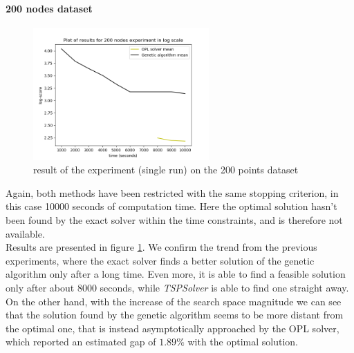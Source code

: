 \documentclass{article}
\begin{document}
\paragraph*{200 nodes dataset}

\begin{figure}
    \centering
\includegraphics[width=0.6\textwidth]{pics/200_nodes_results.png}
\caption{result of the experiment (single run) on the 200 points dataset}
\label{fig:200points}
\end{figure}

Again, both methods have been restricted with the same stopping criterion, in this case 10000 seconds of computation time. Here the optimal solution hasn't been found by the exact solver within the time constraints, and is therefore not available. \\
Results are presented in figure \ref{fig:200points}. We confirm the trend from the previous experiments, where the exact solver finds a better solution of the genetic algorithm only after a long time. Even more, it is able to find a feasible solution only after about 8000 seconds, while \textit{TSPSolver} is able to find one straight away. On the other hand, with the increase of the search space magnitude we can see that the solution found by the genetic algorithm seems to be more distant from the optimal one, that is instead asymptotically approached by the OPL solver, which reported an estimated gap of $1.89\%$ with the optimal solution.
\end{document}
